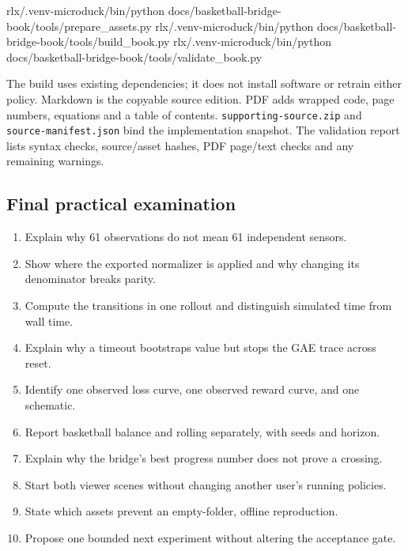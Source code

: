 \documentclass[
  american,
  11pt,
  letterpaper,
]{article}
\newenvironment{Shaded}{\begin{snugshade}}{\end{snugshade}}
\newcommand{\ExtensionTok}[1]{#1}
\newcommand{\NormalTok}[1]{#1}
\providecommand{\tightlist}{%
  \setlength{\itemsep}{0pt}\setlength{\parskip}{0pt}}
\renewenvironment{Shaded}{\par\smallskip}{\par\smallskip}
\begin{document}
\begin{Shaded}
\begin{Highlighting}[]
\ExtensionTok{rlx/.venv{-}microduck/bin/python}\NormalTok{ docs/basketball{-}bridge{-}book/tools/prepare\_assets.py}
\ExtensionTok{rlx/.venv{-}microduck/bin/python}\NormalTok{ docs/basketball{-}bridge{-}book/tools/build\_book.py}
\ExtensionTok{rlx/.venv{-}microduck/bin/python}\NormalTok{ docs/basketball{-}bridge{-}book/tools/validate\_book.py}
\end{Highlighting}
\end{Shaded}

The build uses existing dependencies; it does not install software or
retrain either policy. Markdown is the copyable source edition. PDF adds
wrapped code, page numbers, equations and a table of contents.
\texttt{supporti\allowbreak{}ng-\allowbreak{}source.z\allowbreak{}ip}
and \texttt{source-\allowbreak{}manifest\allowbreak{}.json} bind the
implementation snapshot. The validation report lists syntax checks,
source/asset hashes, PDF page/text checks and any remaining warnings.

\subsection{Final practical
examination}\label{final-practical-examination}

\begin{enumerate}
\def\labelenumi{\arabic{enumi}.}
\tightlist
\item
  Explain why 61 observations do not mean 61 independent sensors.
\item
  Show where the exported normalizer is applied and why changing its
  denominator breaks parity.
\item
  Compute the transitions in one rollout and distinguish simulated time
  from wall time.
\item
  Explain why a timeout bootstraps value but stops the GAE trace across
  reset.
\item
  Identify one observed loss curve, one observed reward curve, and one
  schematic.
\item
  Report basketball balance and rolling separately, with seeds and
  horizon.
\item
  Explain why the bridge's best progress number does not prove a
  crossing.
\item
  Start both viewer scenes without changing another user's running
  policies.
\item
  State which assets prevent an empty-folder, offline reproduction.
\item
  Propose one bounded next experiment without altering the acceptance
  gate.
\end{enumerate}
\end{document}

